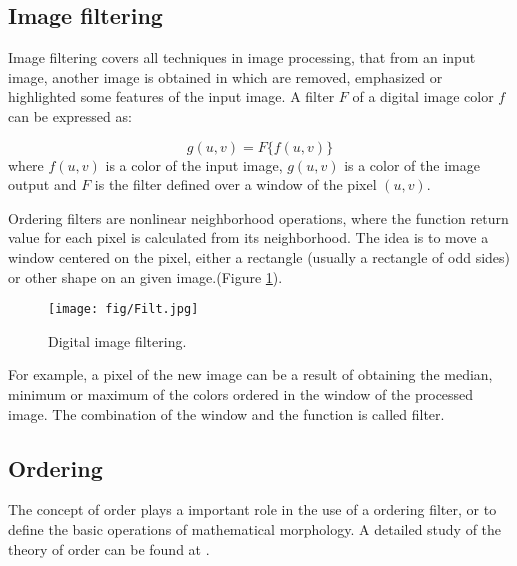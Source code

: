 	




\subsection{Image filtering}
Image filtering covers all techniques in image processing, that from an input image, another image is obtained in which are removed, emphasized or highlighted some features of the input image. 
A filter $F$ of a digital image color $f$ can be expressed as:

\begin{equation}
\label{Filtrado} 
      g(u,v) = F\{f(u,v)\}
\end{equation}
where $f(u,v)$ is a color of the input image, $g(u,v)$ is a color of the image output and $F$ is the filter defined over a window of the pixel $(u,v)$.


Ordering filters are nonlinear neighborhood operations, where the function return value for each pixel is calculated from its neighborhood. The idea is to move a window centered on the pixel, either a rectangle (usually a rectangle of odd sides) or other shape on an given image.(Figure \ref{fig:Filt}). 


\begin{figure}[htbp]
	\centering
		\texttt{[image: fig/Filt.jpg]}
	\caption{Digital image filtering.}
	\label{fig:Filt}
\end{figure}



For example, a pixel of the new image can be a result of obtaining the median, minimum or maximum of the colors ordered in the window of the processed image.  
The combination of the window and the function is called filter. 

\subsection{Ordering}
The concept of order plays a important role in the use of a ordering filter, or to define the basic operations of mathematical morphology. A detailed study of the theory of order can be found at \cite {serra1993anamorphoses}.

